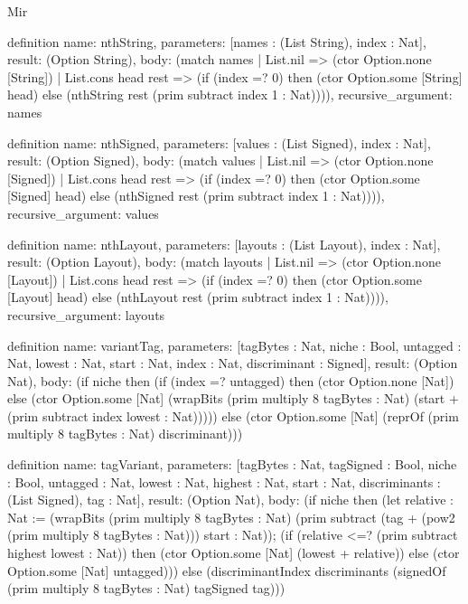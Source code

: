 \begin{lexlean}{Mir}
\begin{semanticmodule}
definition{
  name: nthString,
  parameters: [names : (List String), index : Nat],
  result: (Option String),
  body: (match names
    | List.nil => (ctor Option.none [String])
    | List.cons head rest => (if (index =? 0) then (ctor Option.some [String] head) else (nthString rest (prim subtract index 1 : Nat)))),
  recursive_argument: names
}

definition{
  name: nthSigned,
  parameters: [values : (List Signed), index : Nat],
  result: (Option Signed),
  body: (match values
    | List.nil => (ctor Option.none [Signed])
    | List.cons head rest => (if (index =? 0) then (ctor Option.some [Signed] head) else (nthSigned rest (prim subtract index 1 : Nat)))),
  recursive_argument: values
}

definition{
  name: nthLayout,
  parameters: [layouts : (List Layout), index : Nat],
  result: (Option Layout),
  body: (match layouts
    | List.nil => (ctor Option.none [Layout])
    | List.cons head rest => (if (index =? 0) then (ctor Option.some [Layout] head) else (nthLayout rest (prim subtract index 1 : Nat)))),
  recursive_argument: layouts
}

definition{
  name: variantTag,
  parameters: [tagBytes : Nat, niche : Bool, untagged : Nat, lowest : Nat, start : Nat, index : Nat, discriminant : Signed],
  result: (Option Nat),
  body: (if niche then (if (index =? untagged) then (ctor Option.none [Nat]) else (ctor Option.some [Nat] (wrapBits (prim multiply 8 tagBytes : Nat) (start + (prim subtract index lowest : Nat))))) else (ctor Option.some [Nat] (reprOf (prim multiply 8 tagBytes : Nat) discriminant)))
}

definition{
  name: tagVariant,
  parameters: [tagBytes : Nat, tagSigned : Bool, niche : Bool, untagged : Nat, lowest : Nat, highest : Nat, start : Nat, discriminants : (List Signed), tag : Nat],
  result: (Option Nat),
  body: (if niche then (let relative : Nat := (wrapBits (prim multiply 8 tagBytes : Nat) (prim subtract (tag + (pow2 (prim multiply 8 tagBytes : Nat))) start : Nat)); (if (relative <=? (prim subtract highest lowest : Nat)) then (ctor Option.some [Nat] (lowest + relative)) else (ctor Option.some [Nat] untagged))) else (discriminantIndex discriminants (signedOf (prim multiply 8 tagBytes : Nat) tagSigned tag)))
}


\end{semanticmodule}
\end{lexlean}
